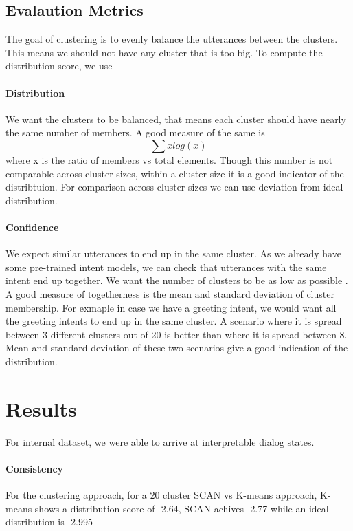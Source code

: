\documentclass{article}
\begin{document}
\subsection{Evalaution Metrics}
The goal of clustering is to evenly balance the utterances between the clusters. This means we should not have any cluster that is too big. To compute the distribution score, we use


\paragraph{Distribution}
We want the clusters to be balanced, that means each cluster should have nearly the same number of members. A good measure of the same is 
\begin{equation}
    \sum xlog(x)
\end{equation}
where x is the ratio of members vs total elements. Though this number is not comparable across cluster sizes, within a cluster size it is a good indicator of the distribtuion. For comparison across cluster sizes we can use deviation from ideal distribution.

\paragraph{Confidence}
We expect similar utterances to end up in the same cluster. As we already have some pre-trained intent models, we can check that utterances with the same intent end up together. We want the number of clusters to be as low as possible . A good measure of togetherness is the mean and standard deviation of cluster membership. For exmaple in case we have a greeting intent, we would want all the greeting intents to end up in the same cluster. A scenario where it is spread between 3 different clusters out of 20 is better than where it is spread between 8. Mean and standard deviation of these two scenarios give a good indication of the distribution.



\section{Results}
For internal dataset, we were able to arrive at interpretable dialog states.

\paragraph{Consistency}
For the clustering approach, for a 20 cluster SCAN vs K-means approach, K-means shows a distribution score of -2.64, SCAN achives -2.77 while an ideal distribution is -2.995
\end{document}
